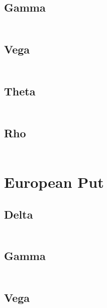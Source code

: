 \documentclass[12pt,a4paper]{article}
\begin{document}
\subsection{Gamma}

\[
\begin{aligned}  
\end{aligned}
\]

\subsection{Vega}

\[
\begin{aligned}  
\end{aligned}
\]

\subsection{Theta}

\[
\begin{aligned}  
\end{aligned}
\]

\subsection{Rho}

\[
\begin{aligned}  
\end{aligned}
\]

\section{European Put}

\subsection{Delta}
\[
\begin{aligned}  
\end{aligned}
\]
\subsection{Gamma}
\[
\begin{aligned}  
\end{aligned}
\]
\subsection{Vega}
\[
\begin{aligned}  
\end{aligned}
\]
\end{document}
